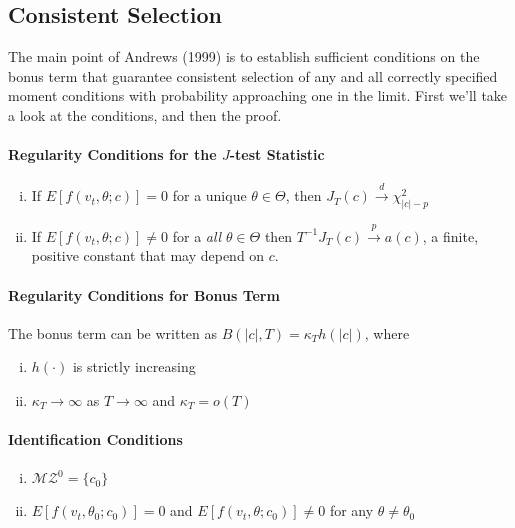 \documentclass[12pt]{article}
\theoremstyle{definition}
\begin{document}
\subsection{Consistent Selection}
The main point of Andrews (1999) is to establish sufficient conditions on the bonus term that guarantee consistent selection of any and all correctly specified moment conditions with probability approaching one in the limit. First we'll take a look at the conditions, and then the proof.

\paragraph{Regularity Conditions for the $J$-test Statistic}
	\begin{enumerate}[(i)]
		\item If $E[f(v_t, \theta;c)] =0$ for a unique $\theta \in \Theta$, then $J_T(c) \overset{d}{\rightarrow} \chi^2_{|c| -p}$
		\item If $E[f(v_t, \theta;c)] \neq 0$ for a \emph{all} $\theta \in \Theta$ then $T^{-1} J_T(c) \overset{p}{\rightarrow} a(c)$, a finite, positive constant that may depend on $c$.
	\end{enumerate}


\paragraph{Regularity Conditions for Bonus Term} The bonus term can be written as $B(|c|,T) = \kappa_T h(|c|)$, where
	\begin{enumerate}[(i)]
		\item $h(\cdot)$ is strictly increasing
		\item $\kappa_T \rightarrow \infty$ as $T\rightarrow \infty$ and $\kappa_T =o(T)$
	\end{enumerate}

\paragraph{Identification Conditions}
	\begin{enumerate}[(i)]
		\item $\mathcal{MZ}^0 = \{c_0\}$
		\item $E[f(v_t, \theta_0; c_0)] = 0$ and $E[f(v_t, \theta; c_0)]\neq 0$ for any $\theta \neq \theta_0$
	\end{enumerate}
\end{document}
